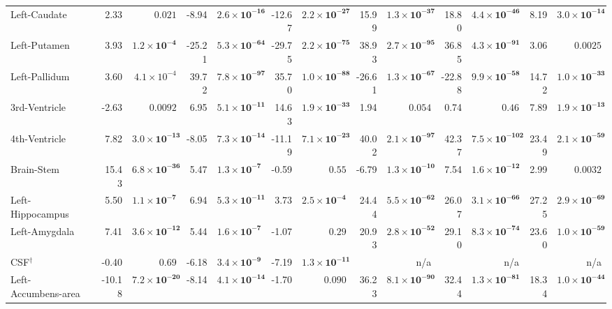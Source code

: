 {\begin{longtable}{llrrrrrrrrrrrr}
Left-Caudate &  & 2.33 & $0.021$ & -8.94 & $\mathbf{2.6{\times}10^{-16}}$ & -12.67 & $\mathbf{2.2{\times}10^{-27}}$ & 15.99 & $\mathbf{1.3{\times}10^{-37}}$ & 18.80 & $\mathbf{4.4{\times}10^{-46}}$ & 8.19 & $\mathbf{3.0{\times}10^{-14}}$ \\
Left-Putamen &  & 3.93 & $\mathbf{1.2{\times}10^{-4}}$ & -25.21 & $\mathbf{5.3{\times}10^{-64}}$ & -29.75 & $\mathbf{2.2{\times}10^{-75}}$ & 38.93 & $\mathbf{2.7{\times}10^{-95}}$ & 36.85 & $\mathbf{4.3{\times}10^{-91}}$ & 3.06 & $0.0025$ \\
Left-Pallidum &  & 3.60 & $4.1{\times}10^{-4}$ & 39.72 & $\mathbf{7.8{\times}10^{-97}}$ & 35.70 & $\mathbf{1.0{\times}10^{-88}}$ & -26.61 & $\mathbf{1.3{\times}10^{-67}}$ & -22.88 & $\mathbf{9.9{\times}10^{-58}}$ & 14.72 & $\mathbf{1.0{\times}10^{-33}}$ \\
3rd-Ventricle &  & -2.63 & $0.0092$ & 6.95 & $\mathbf{5.1{\times}10^{-11}}$ & 14.63 & $\mathbf{1.9{\times}10^{-33}}$ & 1.94 & $0.054$ & 0.74 & $0.46$ & 7.89 & $\mathbf{1.9{\times}10^{-13}}$ \\
4th-Ventricle &  & 7.82 & $\mathbf{3.0{\times}10^{-13}}$ & -8.05 & $\mathbf{7.3{\times}10^{-14}}$ & -11.19 & $\mathbf{7.1{\times}10^{-23}}$ & 40.02 & $\mathbf{2.1{\times}10^{-97}}$ & 42.37 & $\mathbf{7.5{\times}10^{-102}}$ & 23.49 & $\mathbf{2.1{\times}10^{-59}}$ \\
Brain-Stem &  & 15.43 & $\mathbf{6.8{\times}10^{-36}}$ & 5.47 & $\mathbf{1.3{\times}10^{-7}}$ & -0.59 & $0.55$ & -6.79 & $\mathbf{1.3{\times}10^{-10}}$ & 7.54 & $\mathbf{1.6{\times}10^{-12}}$ & 2.99 & $0.0032$ \\
Left-Hippocampus &  & 5.50 & $\mathbf{1.1{\times}10^{-7}}$ & 6.94 & $\mathbf{5.3{\times}10^{-11}}$ & 3.73 & $\mathbf{2.5{\times}10^{-4}}$ & 24.44 & $\mathbf{5.5{\times}10^{-62}}$ & 26.07 & $\mathbf{3.1{\times}10^{-66}}$ & 27.25 & $\mathbf{2.9{\times}10^{-69}}$ \\
Left-Amygdala &  & 7.41 & $\mathbf{3.6{\times}10^{-12}}$ & 5.44 & $\mathbf{1.6{\times}10^{-7}}$ & -1.07 & $0.29$ & 20.93 & $\mathbf{2.8{\times}10^{-52}}$ & 29.10 & $\mathbf{8.3{\times}10^{-74}}$ & 23.60 & $\mathbf{1.0{\times}10^{-59}}$ \\
CSF$^{\dagger}$ &  & -0.40 & $0.69$ & -6.18 & $\mathbf{3.4{\times}10^{-9}}$ & -7.19 & $\mathbf{1.3{\times}10^{-11}}$ &  & n/a &  & n/a &  & n/a \\
Left-Accumbens-area &  & -10.18 & $\mathbf{7.2{\times}10^{-20}}$ & -8.14 & $\mathbf{4.1{\times}10^{-14}}$ & -1.70 & $0.090$ & 36.23 & $\mathbf{8.1{\times}10^{-90}}$ & 32.44 & $\mathbf{1.3{\times}10^{-81}}$ & 18.34 & $\mathbf{1.0{\times}10^{-44}}$ \\

\end{longtable}}
